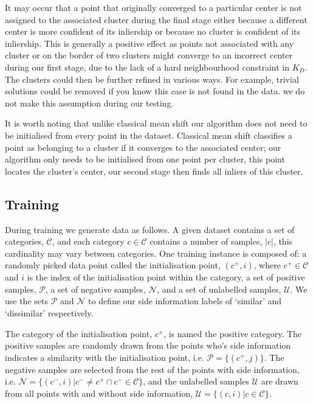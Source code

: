 \documentclass[letterpaper, 11pt]{IEEEtran}
\begin{document}
It may occur that a point that originally converged to a particular center is not assigned to the associated cluster during the final stage either because a different center is more confident of its inliership or because no cluster is confident of its inliership. 
This is generally a positive effect as points not associated with any cluster or on the border of two clusters might converge to an incorrect center during our first stage, due to the lack of a hard neighbourhood constraint in $K_D$.
The clusters could then be further refined in various ways. For example, trivial solutions could be removed if you know this case is not found in the data. we do not make this assumption during our testing.

It is worth noting that unlike classical mean shift our algorithm does not need to be initialised from every point in the dataset. Classical mean shift classifies a point as belonging to a cluster if it converges to the associated center;
our algorithm only needs to be initialised from one point per cluster, this point locates the cluster's center, our second stage then finds all inliers of this cluster.

\subsection{Training}
During training we generate data as follows.
A given dataset contains a set of categories, $\mathcal C$, and each category $c\in\mathcal C$ contains a number of samples, $|c|$, this cardinality  may vary between categories.
One training instance is composed of: a randomly picked data point called the initialisation point, $(c^+,i)$, where $c^+\in\mathcal C$ and $i$ is the index of the initialisation point within the category, a set of positive samples, $\mathcal P$, a set of negative samples, $\mathcal N$, and a set of unlabelled samples,  $\mathcal U$. We use the sets $\mathcal{P}$ and $\mathcal{N}$ to define our side information labels of `similar' and `dissimilar' respectively.

The category of the initialisation point, $c^+$, is named the positive category. The positive samples are randomly drawn from the points who's side information indicates a similarity with the initialisation point, i.e. 
$\mathcal P=\{(c^+,j)\}$. The negative samples are selected from the rest of the points with side information, i.e. $\mathcal N=\{(c^{-},
i)|c^-\neq c^+\cap c^-\in \mathcal C\}$,
and the unlabelled samples $\mathcal U$ are drawn from all points with and without side information, $\mathcal U=\{(c, i)|c \in \mathcal C\}$. 
\end{document}

